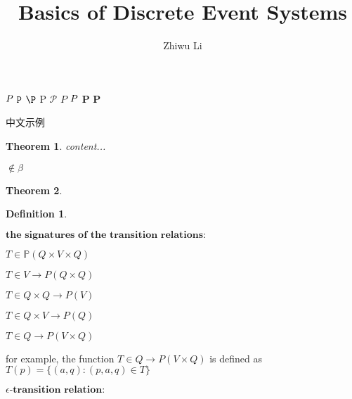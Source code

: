 \documentclass[graybox,envcountchap,sectrefs]{svmono1}
\newtheorem{myTh}{Theorem}
\newtheorem{myDf}{Definition}
\begin{document}
\author{Zhiwu Li}
\title{Basics of Discrete Event Systems}




%
%
%
%
%

%
%


$\emph{P}$ $\texttt{P}$ $\P$  $\mathrm{P}$  $\mathcal{P}$ $\mathit{P}$  $\mathnormal{P}$  $\boldsymbol{P}$  $\mathbf{P}$

中文示例

\begin{myTh}
	content...
\end{myTh}

$\notin\beta$

\begin{myTh}
	
\end{myTh}

\begin{myDf}
	
\end{myDf}

\hfill

$\textbf{the signatures of the transition relations:}$

$T \in \mathbb{P}(Q \times V \times Q)$

$T \in V \to P(Q \times Q)$

$T \in Q\times Q \to P(V)$

$T \in Q \times V \to P(Q)$

$T \in Q \to P(V \times Q)$

for example, the function $T \in Q \to P(V \times Q)$ is defined as $T(p) = \{(a,q):(p,a,q) \in T\}$

\hfill

$\textbf{$\epsilon$-transition relation:}$
\end{document}
